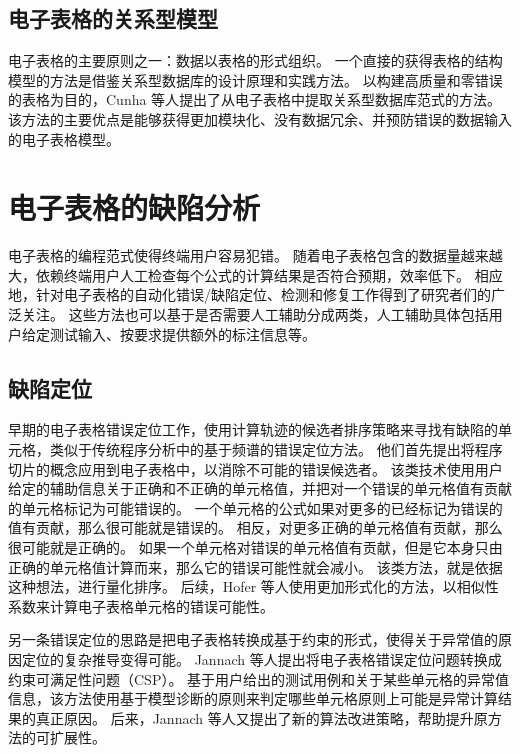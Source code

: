 \subsection{电子表格的关系型模型}
电子表格的主要原则之一：数据以表格的形式组织。
一个直接的获得表格的结构模型的方法是借鉴关系型数据库的设计原理和实践方法。
以构建高质量和零错误的表格为目的，Cunha 等人\cite{cunha2009spreadsheets}提出了从电子表格中提取关系型数据库范式的方法。
该方法的主要优点是能够获得更加模块化、没有数据冗余、并预防错误的数据输入的电子表格模型\cite{cunha2009discovery,cunha2012relational}。


\section{电子表格的缺陷分析}
电子表格的编程范式使得终端用户容易犯错。
随着电子表格包含的数据量越来越大，依赖终端用户人工检查每个公式的计算结果是否符合预期，效率低下。
相应地，针对电子表格的自动化错误/缺陷定位、检测和修复工作得到了研究者们的广泛关注。
这些方法也可以基于是否需要人工辅助分成两类，人工辅助具体包括用户给定测试输入、按要求提供额外的标注信息等。

\subsection{缺陷定位}
早期的电子表格错误定位工作\cite{reichwein1999slicing,ruthruff2005interactive}，使用计算轨迹的候选者排序策略来寻找有缺陷的单元格，类似于传统程序分析中的基于频谱的错误定位方法。
他们首先提出将程序切片的概念应用到电子表格中，以消除不可能的错误候选者。
该类技术使用用户给定的辅助信息关于正确和不正确的单元格值，并把对一个错误的单元格值有贡献的单元格标记为可能错误的。
一个单元格的公式如果对更多的已经标记为错误的值有贡献，那么很可能就是错误的。
相反，对更多正确的单元格值有贡献，那么很可能就是正确的。
如果一个单元格对错误的单元格值有贡献，但是它本身只由正确的单元格值计算而来，那么它的错误可能性就会减小。
该类方法，就是依据这种想法，进行量化排序。
后续，Hofer 等人\cite{hofer2013empirical}使用更加形式化的方法，以相似性系数来计算电子表格单元格的错误可能性。

另一条错误定位的思路是把电子表格转换成基于约束的形式，使得关于异常值的原因定位的复杂推导变得可能。
Jannach 等人\cite{jannach2010toward}提出将电子表格错误定位问题转换成约束可满足性问题（CSP）\cite{tsang2014foundations}。
基于用户给出的测试用例和关于某些单元格的异常值信息，该方法使用基于模型诊断的原则来判定哪些单元格原则上可能是异常计算结果的真正原因。
后来，Jannach 等人\cite{jannach2016model}又提出了新的算法改进策略，帮助提升原方法的可扩展性。


